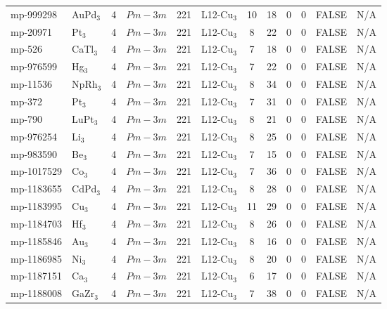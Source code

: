 {\begin{longtable}{llcccccccccc}
    mp-999298 & AuPd$_{3}$ & 4     & $Pm-3m$ & 221   & L12-Cu$_{3}$ & 10    & 18    & 0     & 0     & FALSE & N/A \\
    mp-20971 & Pt$_{3}$ & 4     & $Pm-3m$ & 221   & L12-Cu$_{3}$ & 8     & 22    & 0     & 0     & FALSE & N/A \\
    mp-526 & CaTl$_{3}$ & 4     & $Pm-3m$ & 221   & L12-Cu$_{3}$ & 7     & 18    & 0     & 0     & FALSE & N/A \\
    mp-976599 & Hg$_{3}$ & 4     & $Pm-3m$ & 221   & L12-Cu$_{3}$ & 7     & 22    & 0     & 0     & FALSE & N/A \\
    mp-11536 & NpRh$_{3}$ & 4     & $Pm-3m$ & 221   & L12-Cu$_{3}$ & 8     & 34    & 0     & 0     & FALSE & N/A \\
    mp-372 & Pt$_{3}$ & 4     & $Pm-3m$ & 221   & L12-Cu$_{3}$ & 7     & 31    & 0     & 0     & FALSE & N/A \\
    mp-790 & LuPt$_{3}$ & 4     & $Pm-3m$ & 221   & L12-Cu$_{3}$ & 8     & 21    & 0     & 0     & FALSE & N/A \\
    mp-976254 & Li$_{3}$ & 4     & $Pm-3m$ & 221   & L12-Cu$_{3}$ & 8     & 25    & 0     & 0     & FALSE & N/A \\
    mp-983590 & Be$_{3}$ & 4     & $Pm-3m$ & 221   & L12-Cu$_{3}$ & 7     & 15    & 0     & 0     & FALSE & N/A \\
    mp-1017529 & Co$_{3}$ & 4     & $Pm-3m$ & 221   & L12-Cu$_{3}$ & 7     & 36    & 0     & 0     & FALSE & N/A \\
    mp-1183655 & CdPd$_{3}$ & 4     & $Pm-3m$ & 221   & L12-Cu$_{3}$ & 8     & 28    & 0     & 0     & FALSE & N/A \\
    mp-1183995 & Cu$_{3}$ & 4     & $Pm-3m$ & 221   & L12-Cu$_{3}$ & 11    & 29    & 0     & 0     & FALSE & N/A \\
    mp-1184703 & Hf$_{3}$ & 4     & $Pm-3m$ & 221   & L12-Cu$_{3}$ & 8     & 26    & 0     & 0     & FALSE & N/A \\
    mp-1185846 & Au$_{3}$ & 4     & $Pm-3m$ & 221   & L12-Cu$_{3}$ & 8     & 16    & 0     & 0     & FALSE & N/A \\
    mp-1186985 & Ni$_{3}$ & 4     & $Pm-3m$ & 221   & L12-Cu$_{3}$ & 8     & 20    & 0     & 0     & FALSE & N/A \\
    mp-1187151 & Ca$_{3}$ & 4     & $Pm-3m$ & 221   & L12-Cu$_{3}$ & 6     & 17    & 0     & 0     & FALSE & N/A \\
    mp-1188008 & GaZr$_{3}$ & 4     & $Pm-3m$ & 221   & L12-Cu$_{3}$ & 7     & 38    & 0     & 0     & FALSE & N/A \\

\end{longtable}}
